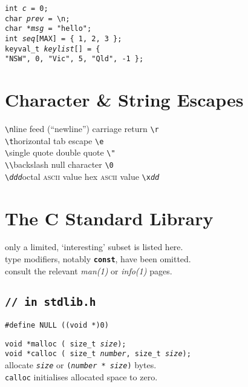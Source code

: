 \documentclass[8pt]{article}
\newcommand{\Cc}[1]{\texttt{#1}}
\newcommand{\cmt}[1]{\textcolor[gray]{.3}{\texttt{#1}}} %
\newcommand{\cpp}[1]{\textcolor{black!20!cyan}{\texttt{\##1}}} %
\newcommand{\ty}[1]{\textcolor{blue!80}{\texttt{#1}}} %
\newcommand{\mty}[1]{\textcolor{blue!80}{\texttt{\textbf{#1}}}} %
\newcommand{\kv}[1]{\textcolor{red!40!black}{\texttt{#1}}} %
\newcommand{\val}[1]{\texttt{#1}} %
\newcommand{\quo}[1]{\textcolor{violet!80!black}{\texttt{#1}}} %
\newcommand{\quot}[1]{\quo{"#1"}} %
\newcommand{\fn}[1]{\texttt{#1}} %
\newcommand{\var}[1]{\texttt{\textit{#1}}} %
\newcommand{\opt}[1]{\textrm{\textit{#1}}} %
\newcommand{\htab}{\hspace*{2em}} %
\newcommand{\Cq}{\textquotesingle} %
\newcommand{\Cx}{\textbackslash} %
\begin{document}
\begin{multicols}{3}
\Cc{\ty{int} \var{c} = \val{0}; \\
\ty{char} \var{prev} = \val{\Cq\Cx n\Cq}; \\
\ty{char *}\var{msg} = \quot{hello}; \\
\ty{int} \var{seq}[\kv{MAX}] = \{ \val{1}, \val{2}, \val{3} \}; \\
\ty{keyval\_t} \var{keylist}[] = \{ \\
\htab\quot{NSW}, \val{0},  \quot{Vic}, \val{5},   \quot{Qld}, \val{-1} \}; }

\section*{Character \& String Escapes}

\Cc{\Cx n}\quad line feed (``newline'') \hfill
carriage return \quad\Cc{\Cx r}\\
\Cc{\Cx t}\quad horizontal tab \hfill
escape \quad\Cc{\Cx e}\\
\Cc{\Cx \Cq}\quad single quote \hfill
double quote \quad\Cc{\Cx " }\\
\Cc{\Cx \Cx}\quad backslash \hfill
null character \quad\Cc{\Cx 0}\\
\Cc{\Cx \opt{ddd}}\quad octal \textsc{ascii} value \hfill
hex \textsc{ascii} value \quad\Cc{\Cx x\opt{dd}} \\


\section*{The C Standard Library}

\begin{center}
only a limited, `interesting' subset is listed here. \\
type modifiers, notably \mty{const}, have been omitted. \\
consult the relevant \textit{man(1)} or \textit{info(1)} pages.
\end{center}

\subsection*{\Cc{\cmt{// in stdlib.h}}}

\Cc{\cpp{define} \kv{NULL} ((\ty{void *})\val{0})}

\Cc{\ty{void *}\fn{malloc}\,(%
    \ty{size\_t} \var{size});} \\
\Cc{\ty{void *}\fn{calloc}\,(%
    \ty{size\_t} \var{number}, %
    \ty{size\_t} \var{size});} \\
\htab allocate \var{size} or \Cc{(\var{number} * \var{size})} bytes. \\
\htab \fn{calloc} initialises allocated space to zero.


\end{multicols}
\end{document}
